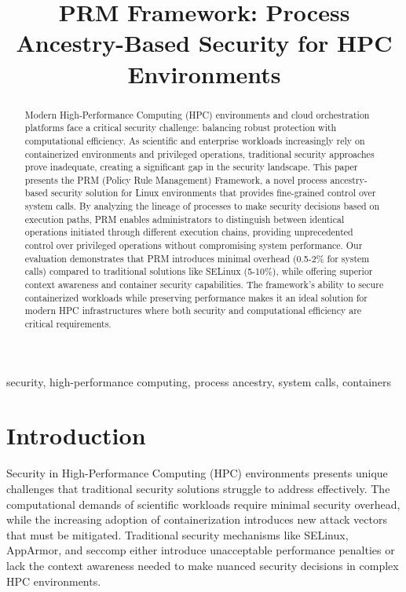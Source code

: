 \documentclass[conference]{IEEEtran}
\begin{document}
\title{PRM Framework: Process Ancestry-Based Security for HPC Environments}

\author{
\IEEEauthorblockN{}
\IEEEauthorblockA{}
}

\maketitle

\begin{abstract}
Modern High-Performance Computing (HPC) environments and cloud orchestration platforms face a critical security challenge: balancing robust protection with computational efficiency. As scientific and enterprise workloads increasingly rely on containerized environments and privileged operations, traditional security approaches prove inadequate, creating a significant gap in the security landscape. This paper presents the PRM (Policy Rule Management) Framework, a novel process ancestry-based security solution for Linux environments that provides fine-grained control over system calls. By analyzing the lineage of processes to make security decisions based on execution paths, PRM enables administrators to distinguish between identical operations initiated through different execution chains, providing unprecedented control over privileged operations without compromising system performance. Our evaluation demonstrates that PRM introduces minimal overhead (0.5-2\% for system calls) compared to traditional solutions like SELinux (5-10\%), while offering superior context awareness and container security capabilities. The framework's ability to secure containerized workloads while preserving performance makes it an ideal solution for modern HPC infrastructures where both security and computational efficiency are critical requirements.
\end{abstract}

\begin{IEEEkeywords}
security, high-performance computing, process ancestry, system calls, containers
\end{IEEEkeywords}

\section{Introduction}
Security in High-Performance Computing (HPC) environments presents unique challenges that traditional security solutions struggle to address effectively. The computational demands of scientific workloads require minimal security overhead, while the increasing adoption of containerization introduces new attack vectors that must be mitigated. Traditional security mechanisms like SELinux, AppArmor, and seccomp either introduce unacceptable performance penalties or lack the context awareness needed to make nuanced security decisions in complex HPC environments.
\end{document}
